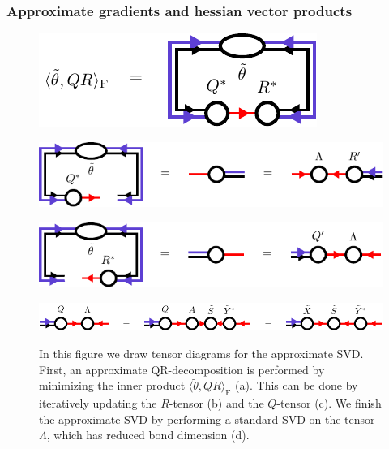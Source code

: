 \subsubsection*{\hspace{70pt}Approximate gradients and hessian vector products}
\begin{figure}
	\centering
	\subcaptionbox{\label{fig:approximate_svd_overlap}}
	{%
		\includegraphics[scale=1]{figures/tikz/YB_isoTPS/approximate_svd/approximate_svd_a.pdf}
	}
	\par\bigskip
	\subcaptionbox{\label{fig:approximate_svd_first_step}}
	{%
		\includegraphics[scale=1]{figures/tikz/YB_isoTPS/approximate_svd/approximate_svd_b.pdf}
	}
	\par\bigskip
	\subcaptionbox{\label{fig:approximate_svd_second_step}}
	{%
		\includegraphics[scale=1]{figures/tikz/YB_isoTPS/approximate_svd/approximate_svd_c.pdf}
	}
	\par\bigskip
	\subcaptionbox{\label{fig:approximate_svd_final_step}}
	{%
		\includegraphics[scale=1]{figures/tikz/YB_isoTPS/approximate_svd/approximate_svd_d.pdf}
	}
	\caption{In this figure we draw tensor diagrams for the approximate SVD. First, an approximate QR-decomposition is performed by minimizing the inner product $\langle\tilde{\theta},QR\rangle_\text{F}$ (a). This can be done by iteratively updating the $R$-tensor (b) and the $Q$-tensor (c). We finish the approximate SVD by performing a standard SVD on the tensor $\Lambda$, which has reduced bond dimension (d).}
	\label{fig:approximate_qr_decomposition}
\end{figure}
